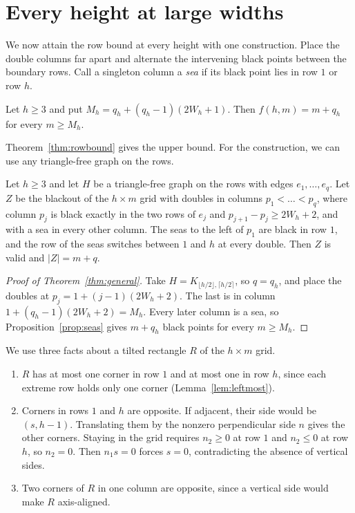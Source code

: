 \section{Every height at large widths}\label{sec:general}

We now attain the row bound at every height with one construction.
Place the double columns far apart and alternate the intervening black points
between the boundary rows. Call a singleton column a \emph{sea} if its black
point lies in row $1$ or row $h$.

\begin{theorem}\label{thm:general}
Let $h\ge3$ and put $M_h=q_h+(q_h-1)(2W_h+1)$. Then $f(h,m)=m+q_h$ for every $m\ge M_h$.
\end{theorem}

Theorem~\ref{thm:rowbound} gives the upper bound. For the construction,
we can use any triangle-free graph on the rows.

\begin{proposition}\label{prop:seas}
Let $h\ge3$ and let $H$ be a triangle-free graph on the rows with edges $e_1,\dots,e_q$.
Let $Z$ be the blackout of the $h\times m$ grid with doubles in columns $p_1<\dots<p_q$, where
column $p_j$ is black exactly in the two rows of $e_j$ and $p_{j+1}-p_j\ge2W_h+2$, and with a sea
in every other column. The seas to the left of $p_1$ are black in row $1$, and the row of the
seas switches between $1$ and $h$ at every double. Then $Z$ is valid and $|Z|=m+q$.
\end{proposition}

\begin{proof}[Proof of Theorem~\ref{thm:general}]
Take $H=K_{\lfloor h/2\rfloor,\lceil h/2\rceil}$, so $q=q_h$, and place the doubles
at $p_j=1+(j-1)(2W_h+2)$. The last is in column $1+(q_h-1)(2W_h+2)=M_h$.
Every later column is a sea, so Proposition~\ref{prop:seas} gives $m+q_h$
black points for every $m\ge M_h$.
\end{proof}

We use three facts about a tilted rectangle $R$ of the $h\times m$ grid.
\begin{enumerate}[(F1)]
\item $R$ has at most one corner in row $1$ and at most one in row $h$,
since each extreme row holds only one corner (Lemma~\ref{lem:leftmost}).
\item Corners in rows $1$ and $h$ are opposite. If adjacent, their side would be
$(s,h-1)$. Translating them by the nonzero perpendicular side $n$ gives the
other corners. Staying in the grid requires $n_2\ge0$ at row $1$ and
$n_2\le0$ at row $h$, so $n_2=0$. Then $n_1s=0$ forces $s=0$,
contradicting the absence of vertical sides.
\item Two corners of $R$ in one column are opposite, since a vertical side would make $R$
axis-aligned.
\end{enumerate}

